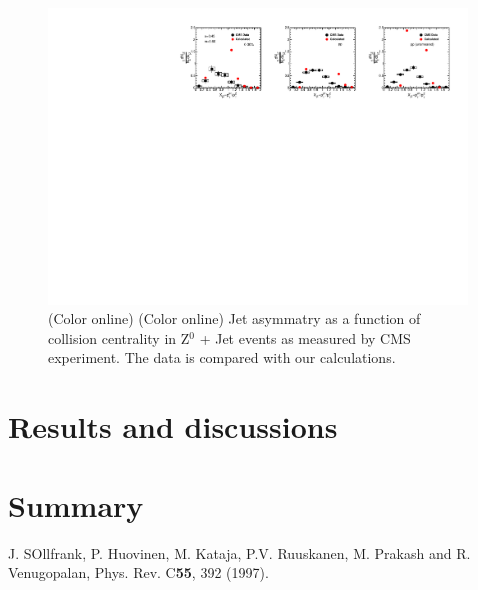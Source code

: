 \documentclass[reprint,amsmath,amssymb,aps,showpacs,showkeys]{revtex4}
\begin{document}
\begin{figure}
  \includegraphics[width=0.99\textwidth]{Figures/Fig_XJ_Z0Jet_Centrality.pdf}
  \caption{(Color online) (Color online) Jet asymmatry as a function of collision centrality
    in Z$^{0}$ + Jet events as measured by CMS experiment. The data is compared with our
    calculations.}
  \label{Fig:JetAsymZ0JetCent}
\end{figure}

\section{Results and discussions}
\label{Sec:ResultsAndDiss}


\section{Summary}
\label{Sec:Summary}



\begin{thebibliography}{100}
  
 J. SOllfrank, P. Huovinen, M. Kataja, P.V. Ruuskanen,
  M. Prakash and R. Venugopalan, 
  Phys. Rev. C{\bf 55}, 392 (1997).

\end{thebibliography}
\end{document}
